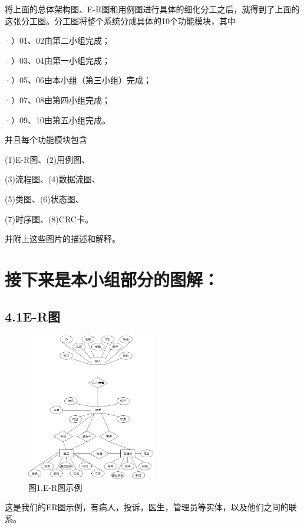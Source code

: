 \documentclass[24pt,a4paper]{article}%
\begin{document}
将上面的总体架构图、E-R图和用例图进行具体的细化分工之后，就得到了上面的这张分工图。分工图将整个系统分成具体的10个功能模块，其中\par
·）01、02由第二小组完成；\par
·）03、04由第一小组完成；\par
·）05、06由本小组（第三小组）完成；\par
·）07、08由第四小组完成；\par
·）09、10由第五小组完成。\par
并且每个功能模块包含\par \quad \quad(1)E-R图、(2)用例图、\par \quad \quad(3)流程图、(4)数据流图、\par \quad \quad(5)类图、(6)状态图、\par \quad \quad(7)时序图、(8)CRC卡。\par 并附上这些图片的描述和解释。
\newpage

\section*{\songti 接下来是本小组部分的图解：}
\subsection*{\songti 4.1E-R图}
\begin{figure}[H]
    \centering
    \includegraphics[width=0.5\textwidth]{images/ERGraph.png}
    \caption*{图1.E-R图示例}
\end{figure}
这是我们的ER图示例，有病人，投诉，医生，管理员等实体，以及他们之间的联系。
\end{document}
